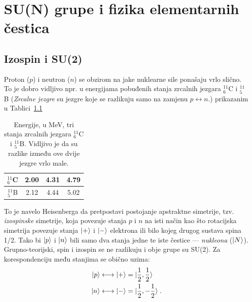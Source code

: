 
\chapter{SU(N) grupe i fizika elementarnih čestica}

\section{Izospin i SU(2)}
\label{sec:izospin}
Proton ($p$) i neutron ($n$) se obzirom na jake nuklearne
sile ponašaju vrlo slično. To je dobro vidljivo npr. u energijama
pobuđenih stanja zrcalnih jezgara $^{11}_{6}$C i $^{11}_{5}$B 
(\emph{Zrcalne jezgre} su jezgre koje se razlikuju samo na zamjenu
$p \leftrightarrow n$.) prikazanim u Tablici~\ref{mirror}
\begin{table}
\caption{\label{mirror}Energije, u MeV, tri stanja zrcalnih jezgara
$^{11}_{6}$C i $^{11}_{5}$B.  Vidljivo je da su razlike između ove dvije
jezgre vrlo male.}
\begin{center}
\begin{tabular}{c|ccc}
$^{11}_{6}$C & 2.00 & 4.31 & 4.79 \\[3pt] \hline
$^{11}_{5}$B & 2.12 & 4.44 & 5.02
\end{tabular}
\end{center}
\end{table}
To je navelo Heisenberga da pretpostavi postojanje apstraktne simetrije,
tzv. \emph{izospinske} simetrije,
koja povezuje stanja $p$ i $n$ na isti način kao što rotacijska simetrija
povezuje stanja $| + \rangle$ i $| - \rangle$
elektrona ili bilo kojeg drugog sustava spina 1/2. Tako bi $| p \rangle$ i $| n \rangle$
bili samo dva stanja jedne te iste čestice --- \emph{nukleona} ($| N \rangle$).
Grupno-teorijski, spin i izospin se ne razlikuju i obje grupe su SU(2).
Za korespondenciju među stanjima se obično uzima:
\begin{align}
   | p \rangle &\longleftrightarrow | + \rangle = | \frac{1}{2}, \frac{1}{2} \rangle  \\
   | n \rangle &\longleftrightarrow | - \rangle = | \frac{1}{2},-\frac{1}{2} \rangle \;.
\end{align}

